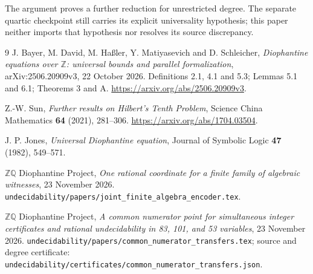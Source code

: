 \documentclass[11pt]{article}
\newcommand{\Q}{\mathbb Q}\newcommand{\Z}{\mathbb Z}
\begin{document}
The argument proves a further reduction for unrestricted degree.
The separate quartic checkpoint still carries its explicit
universality hypothesis; this paper neither imports that hypothesis
nor resolves its source discrepancy.

\begin{thebibliography}{9}
J. Bayer, M. David, M. Ha{\ss}ler, Y. Matiyasevich and D. Schleicher,
\emph{Diophantine equations over \(\Z\): universal bounds and parallel
formalization}, arXiv:2506.20909v3, 22 October 2026.
Definitions 2.1, 4.1 and 5.3; Lemmas 5.1 and 6.1; Theorems 3 and A.
\url{https://arxiv.org/abs/2506.20909v3}.

Z.-W. Sun, \emph{Further results on Hilbert's Tenth Problem},
Science China Mathematics \textbf{64} (2021), 281--306.
\url{https://arxiv.org/abs/1704.03504}.

J. P. Jones, \emph{Universal Diophantine equation},
Journal of Symbolic Logic \textbf{47} (1982), 549--571.

\(\Z\Q\) Diophantine Project,
\emph{One rational coordinate for a finite family of algebraic witnesses},
23 November 2026.
\nolinkurl{undecidability/papers/joint_finite_algebra_encoder.tex}.

\(\Z\Q\) Diophantine Project,
\emph{A common numerator point for simultaneous integer certificates
and rational undecidability in 83, 101, and 53 variables},
23 November 2026.
\nolinkurl{undecidability/papers/common_numerator_transfers.tex};
source and degree certificate:
\nolinkurl{undecidability/certificates/common_numerator_transfers.json}.
\end{thebibliography}
\end{document}
